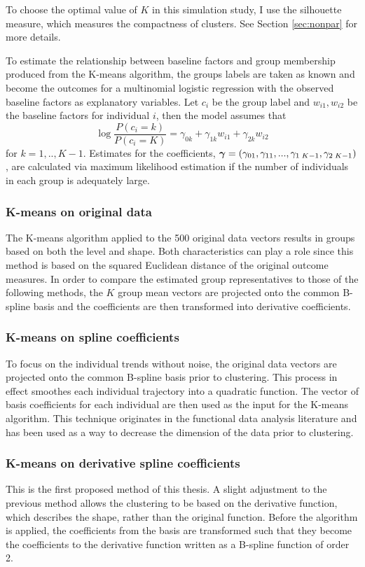 To choose the optimal value of $K$ in this simulation study, I use the silhouette measure, which measures the compactness of clusters. See Section \ref{sec:nonpar} for more details. 

To estimate the relationship between baseline factors and group membership produced from the K-means algorithm, the groups labels are taken as known and become the outcomes for a multinomial logistic regression with the observed baseline factors as explanatory variables. Let $c_{i}$ be the group label and $w_{i1}, w_{i2}$ be the baseline factors for individual $i$, then the model assumes that
$$\log\frac{P(c_{i}=k)}{P(c_{i}=K)} = \gamma_{0k}+\gamma_{1k}w_{i1}+\gamma_{2k}w_{i2}$$
for $k=1,..,K-1$. Estimates for the coefficients, $\boldsymbol\gamma = (\gamma_{01},\gamma_{11},...,\gamma_{1\;K-1},\gamma_{2\;K-1})$, are calculated via maximum likelihood estimation if the number of individuals in each group is adequately large.

\subsubsection{K-means on original data}
The K-means algorithm applied to the 500 original data vectors results in groups based on both the level and shape. Both characteristics can play a role since this method is based on the squared Euclidean distance of the original outcome measures. In order to compare the estimated group representatives to those of the following methods, the $K$ group mean vectors are projected onto the common B-spline basis and the coefficients are then transformed into derivative coefficients.  

\subsubsection{K-means on spline coefficients}
To focus on the individual trends without noise, the original data vectors are projected onto the common B-spline basis prior to clustering. This process in effect smoothes each individual trajectory into a quadratic function. The vector of basis coefficients for each individual are then used as the input for the K-means algorithm. This technique originates in the functional data analysis literature \cite{ramsay2005} and has been used as a way to decrease the dimension of the data prior to clustering. 

\subsubsection{K-means on derivative spline coefficients}
This is the first proposed method of this thesis. A slight adjustment to the previous method allows the clustering to be based on the derivative function, which describes the shape, rather than the original function. Before the algorithm is applied, the coefficients from the basis are transformed such that they become the coefficients to the derivative function written as a B-spline function of order 2. 

